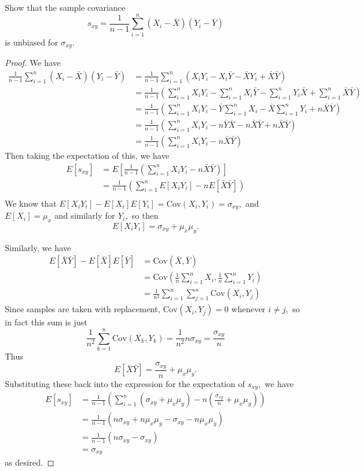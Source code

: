 \documentclass{article}
\newcommand{\cov}{\mathrm{Cov}}
\begin{document}
\begin{enumerate}
		Show that the sample covariance \[s_{xy}=\frac{1}{n-1}\sum_{i=1}^n (X_i-\bar{X})(Y_i-\bar{Y})\] is unbiased for $\sigma_{xy}.$
		\begin{proof}
			We have
			\begin{align*}
				\frac{1}{n-1}\sum_{i=1}^{n} (X_i-\bar{X})(Y_i-\bar{Y}) &= \frac{1}{n-1}\sum_{i=1}^{n} (X_iY_i-X_i\bar{Y}-\bar{X}Y_i+\bar{X}\bar{Y}) \\
				&= \frac{1}{n-1}\left(\sum_{i=1}^{n} X_iY_i - \sum_{i=1}^{n} X_i \bar{Y} - \sum_{i=1}^{n} Y_i\bar{X} + \sum_{i=1}^{n} \bar{X}\bar{Y} \right) \\
				&= \frac{1}{n-1}\left( \sum_{i=1}^{n} X_iY_i - \bar{Y}\sum_{i=1}^{n} X_i - \bar{X}\sum_{i=1}^{n} Y_i + n\bar{X}\bar{Y} \right) \\
				&= \frac{1}{n-1}\left( \sum_{i=1}^{n} X_iY_i - n\bar{Y}\bar{X}-n\bar{X}\bar{Y}+n\bar{X}\bar{Y} \right) \\
				&= \frac{1}{n-1}\left( \sum_{i=1}^{n} X_iY_i - n\bar{X}\bar{Y} \right)
			\end{align*} 
			Then taking the expectation of this, we have 
			\begin{align*}
				E[s_{xy}] &= E\left[ \frac{1}{n-1}\left( \sum_{i=1}^{n} X_iY_i - n\bar{X}\bar{Y} \right) \right] \\
				&= \frac{1}{n-1} \left(\sum_{i=1}^{n} E[X_iY_i]-nE[\bar{X}\bar{Y}]\right) \\
			\end{align*}
			We know that $E[X_iY_i]-E[X_i]E[Y_i]=\cov(X_i, Y_i)=\sigma_{xy},$ and $E[X_i]=\mu_x$ and similarly for $Y_i,$ so then \[E[X_iY_i]=\sigma_{xy}+\mu_x\mu_y.\] 

			Similarly, we have 
			\begin{align*}
				E[\bar{X}\bar{Y}]-E[\bar{X}]E[\bar{Y}]&=\cov(\bar{X}, \bar{Y}) \\
				&= \cov\left( \frac{1}{n}\sum_{i=1}^{n} X_i, \frac{1}{n}\sum_{i=1}^{n}Y_i \right) \\
				&= \frac{1}{n^2} \sum_{i=1}^{n}\sum_{j=1}^{n}\cov(X_i, Y_j)
			\end{align*}
			Since samples are taken with replacement, $\cov(X_i, Y_j)=0$ whenever $i\neq j,$ so in fact this sum is just \[\frac{1}{n^2}\sum_{k=1}^{n}\cov(X_k, Y_k) = \frac{1}{n^2}n\sigma_{xy} = \frac{\sigma_{xy}}{n}\] Thus \[E[\bar{X}\bar{Y}]=\frac{\sigma_{xy}}{n}+\mu_x\mu_y.\] Substituting these back into the expression for the expectation of $s_{xy},$ we have 
			\begin{align*}
				E[s_{xy}] &= \frac{1}{n-1}\left( \sum_{i=1}^{n} (\sigma_{xy}+\mu_x\mu_y) - n\left( \frac{\sigma_{xy}}{n}+\mu_x\mu_y \right) \right) \\
				&= \frac{1}{n-1} \left( n\sigma_{xy}+n\mu_x\mu_y-\sigma_{xy}-n\mu_x\mu_y \right) \\
				&= \frac{1}{n-1}(n\sigma_{xy}-\sigma_{xy}) \\
				&= \sigma_{xy}
			\end{align*} as desired.

		\end{proof}

\end{enumerate}
\end{document}
